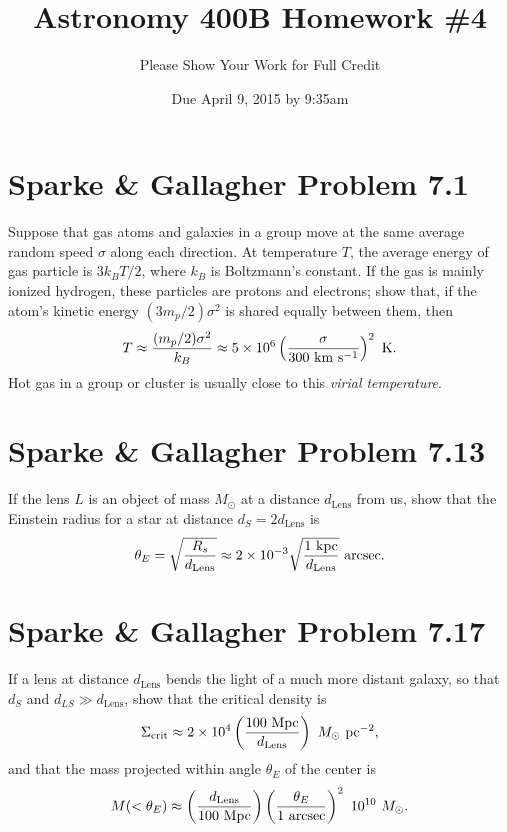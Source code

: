 \documentclass[]{article}
\title{Astronomy 400B Homework \#4}
\author{Please Show Your Work for Full Credit}
\date{Due April 9, 2015 by 9:35am}
\begin{document}
\maketitle

\section{Sparke \& Gallagher Problem 7.1}

Suppose that gas atoms and galaxies in a group move at the same average random speed $\sigma$ along each direction. At temperature $T$, the average energy of gas particle is $3k_B T/2$, where $k_B$ is Boltzmann's constant.  If the gas is mainly ionized hydrogen, these particles are protons and electrons; show that, if the atom's kinetic energy $(3 m_p/2)\sigma^2$ is shared equally
between them, then
\begin{equation}
T \approx \frac{(m_p/2)\sigma^2}{k_B} \approx 5 \times 10^6 \left( \frac{\sigma}{300~\mathrm{km}~\mathrm{s}^{-1}}\right)^2~\mathrm{K}.
\end{equation}
\noindent
Hot gas in a group or cluster is usually close to this {\it virial temperature}.

\section{Sparke \& Gallagher Problem 7.13}

If the lens $L$ is an object of mass $M_{\odot}$ at a distance $d_{\mathrm{Lens}}$ from
us, show that the Einstein radius for a star at distance $d_S = 2 d_{\mathrm{Lens}}$ is
\begin{equation}
\theta_{E} = \sqrt{\frac{R_s}{d_{\mathrm{Lens}}}} \approx 2 \times 10^{-3} \sqrt{\frac{1~\mathrm{kpc}}{d_{\mathrm{Lens}}}}~\mathrm{arcsec}.
\end{equation}

\section{Sparke \& Gallagher Problem 7.17}

If a lens at distance $d_{\mathrm{Lens}}$ bends the light of a much more
distant galaxy, so that $d_S$ and $d_{LS}\gg d_{\mathrm{Lens}}$, show that the
critical density is
\begin{equation}
\Sigma_{\mathrm{crit}} \approx 2 \times 10^4 \left( \frac{100~\mathrm{Mpc}}{d_{\mathrm{Lens}}}\right)~M_{\odot}~\mathrm{pc}^{-2},
\end{equation}
\noindent
and that the mass projected within angle $\theta_E$ of the center is
\begin{equation}
M(<\theta_E) \approx \left(\frac{d_{\mathrm{Lens}}}{100~\mathrm{Mpc}}\right)\left(\frac{\theta_E}{1~\mathrm{arcsec}}\right)^2 ~ 10^{10}~M_{\odot}.
\end{equation}
\end{document}

